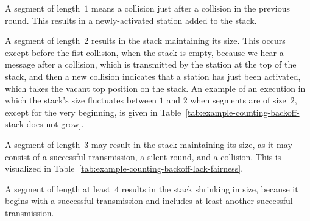\documentclass[11pt]{article}
\begin{document}
A segment of length~$1$  means a collision just after a collision in the previous round.
This results in a newly-activated station added to the stack.

A segment of length~$2$ results in the stack maintaining its size.
This occurs except before the fist collision, when the stack is empty, because we hear a message after a collision, which is transmitted by the station at the top of the stack, and then a new collision indicates that a station has just been activated, which takes the vacant top position on the stack.
An example of an execution in which the stack's size fluctuates between $1$ and $2$ when segments are of size~$2$, except for the very beginning, is given in Table~\ref{tab:example-counting-backoff-stack-does-not-grow}.

A segment of length~$3$ may result in the stack maintaining its size, as it may consist of a successful transmission, a silent round, and a collision.
This is visualized in Table~\ref{tab:example-counting-backoff-lack-fairness}.

A segment of length at least~$4$ results in the stack shrinking in size, because it begins with a successful transmission and  includes at least another successful transmission.
\end{document}
